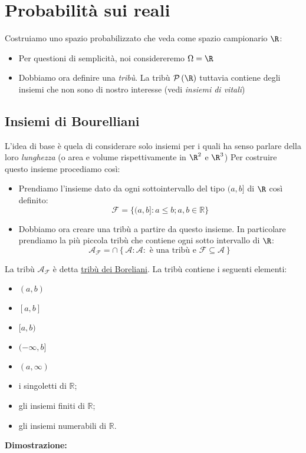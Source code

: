 \section{Probabilità sui reali}
Costruiamo uno spazio probabilizzato che veda come spazio campionario $ \R  $:
\begin{itemize}
	\item Per questioni di semplicità, noi considereremo $ \Omega = \R $
	\item Dobbiamo ora definire una \textit{tribù}. La tribù $ \mathcal{P}\left(\R \right) $ tuttavia contiene degli insiemi che non sono di nostro interesse (vedi \textit{insiemi di vitali})
\end{itemize}
\subsection{Insiemi di Bourelliani}
L'idea di base è quela di considerare solo insiemi per i quali ha senso parlare della loro \textit{lunghezza} (o area e volume rispettivamente in $ \R ^{2} $ e $ \R ^{3} $)
Per costruire questo insieme procediamo così:
\begin{itemize}
	\item Prendiamo l'insieme dato da ogni sottointervallo del tipo $ (a,b] $ di $ \R  $ così definito:
	      \[
		      \mathcal{F}=\{(a, b]: a \leq b ; a, b \in \mathbb{R}\}
	      \]
	\item Dobbiamo ora creare una tribù a partire da questo insieme. In particolare prendiamo la più piccola tribù che contiene ogni sotto intervallo di $ \R  $:
	      \[
		      \mathcal{A}_{\mathcal{F}} = \cap \left\{\mathcal{A}: \mathcal{A}: \text{ è una tribù e } \mathcal{F} \subseteq \mathcal{A} \right\}
	      \]
\end{itemize}
La tribù $ \mathcal{A}_{\mathcal{F}} $ è detta \underline{tribù dei Boreliani}. La tribù contiene i seguenti elementi:
\begin{itemize}
	\item $(a, b)$
	\item $[a, b]$
	\item $[a, b)$
	\item $(-\infty, b]$
	\item $(a, \infty)$
	\item i singoletti di $\mathbb{R}$;
	\item gli insiemi finiti di $\mathbb{R}$;
	\item gli insiemi numerabili di $\mathbb{R}$.
\end{itemize}
\textbf{Dimostrazione:}
